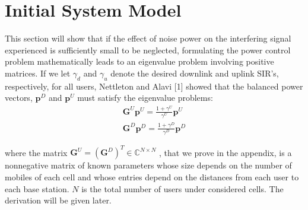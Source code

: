 \documentclass[conference]{IEEEtran}
\begin{document}
\section{Initial System Model}
This section will show that if the effect of noise power on the interfering signal experienced is sufficiently small to be neglected, formulating the power control problem mathematically leads to an eigenvalue problem involving positive matrices. If we let $\gamma_d$ and $\gamma_u$ denote the desired downlink and uplink SIR’s, respectively, for all users, Nettleton and Alavi [1] showed that the balanced power vectors, $\bm{p}^D$ and $\bm{p}^U$ must satisfy the eigenvalue problems:
\begin{align}
\bm{G}^U \bm{p}^U = \frac{1+\gamma^U}{\gamma^U}\bm{p}^U \\
 \bm{G}^D \bm{p}^D = \frac{1+\gamma^D}{\gamma^D}\bm{p}^D
\end{align}



where the matrix $\bm{G}^U = (\bm{G}^D)^T\in \mathbb{C}^{N\times N}$ , that we prove in the appendix, is a nonnegative matrix of known parameters whose size depends on the number of mobiles of each cell and whose entries depend on the distances from each user to each base station. $N$ is the total number of users under considered cells. The derivation will be given later.
\end{document}
